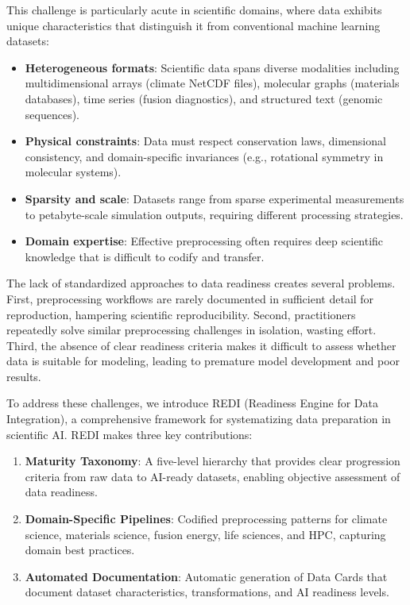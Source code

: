 \documentclass[11pt,letterpaper,twocolumn]{article}
\begin{document}
This challenge is particularly acute in scientific domains, where data exhibits unique characteristics that distinguish it from conventional machine learning datasets:
\begin{itemize}
    \item \textbf{Heterogeneous formats}: Scientific data spans diverse modalities including multidimensional arrays (climate NetCDF files), molecular graphs (materials databases), time series (fusion diagnostics), and structured text (genomic sequences).
    \item \textbf{Physical constraints}: Data must respect conservation laws, dimensional consistency, and domain-specific invariances (e.g., rotational symmetry in molecular systems).
    \item \textbf{Sparsity and scale}: Datasets range from sparse experimental measurements to petabyte-scale simulation outputs, requiring different processing strategies.
    \item \textbf{Domain expertise}: Effective preprocessing often requires deep scientific knowledge that is difficult to codify and transfer.
\end{itemize}

The lack of standardized approaches to data readiness creates several problems. First, preprocessing workflows are rarely documented in sufficient detail for reproduction, hampering scientific reproducibility. Second, practitioners repeatedly solve similar preprocessing challenges in isolation, wasting effort. Third, the absence of clear readiness criteria makes it difficult to assess whether data is suitable for modeling, leading to premature model development and poor results.

To address these challenges, we introduce REDI (Readiness Engine for Data Integration), a comprehensive framework for systematizing data preparation in scientific AI. REDI makes three key contributions:

\begin{enumerate}
    \item \textbf{Maturity Taxonomy}: A five-level hierarchy that provides clear progression criteria from raw data to AI-ready datasets, enabling objective assessment of data readiness.
    \item \textbf{Domain-Specific Pipelines}: Codified preprocessing patterns for climate science, materials science, fusion energy, life sciences, and HPC, capturing domain best practices.
    \item \textbf{Automated Documentation}: Automatic generation of Data Cards \citep{datacards2022} that document dataset characteristics, transformations, and AI readiness levels.
\end{enumerate}
\end{document}
